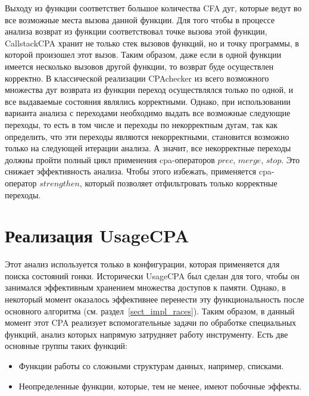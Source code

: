 Выходу из функции соответствет большое количества CFA дуг, которые ведут во все возможные места вызова данной функции.
Для того чтобы в процессе анализа возврат из функции соответствовал точке вызова этой функции, CallstackCPA хранит не только стек вызовов функций, но и точку программы, в которой произошел этот вызов.
Таким образом, даже если в одной функции имеется несколько вызовов другой функции, то возврат буде осуществлен корректно.
В классической реализации CPAchecker из всего возможного множества дуг возврата из функции переход осуществлялся только по одной, и все выдаваемые состояния являлись корректными.
Однако, при использовании варианта анализа с переходами необходимо выдать все возможные следующие переходы, то есть в том числе и переходы по некорректным дугам, так как определить, что эти переходы являются некорректными, становится возможно только на следующей итерации анализа.
А значит, все некорректные переходы должны пройти полный цикл применения cpa-операторов $prec$, $merge$, $stop$.
Это снижает эффективность анализа.
Чтобы этого избежать, применяется cpa-оператор $strengthen$, который позволяет отфильтровать только корректные переходы.

\section{Реализация UsageCPA}
\label{sect_impl_usage}
Этот анализ используется только в конфигурации, которая применяется для поиска состояний гонки.
Исторически UsageCPA был сделан для того, чтобы он занимался эффективным хранением множества доступов к памяти.
Однако, в некоторый момент оказалось эффективнее перенести эту функциональность после основного алгоритма (см. раздел~\ref{sect_impl_races}).
Таким образом, в данный момент этот CPA реализует вспомогательные задачи по обработке специальных функций, анализ которых напрямую затрудняет работу инструменту.
Есть две основные группы таких функций:
\begin{itemize}
\item Функции работы со сложными структурам данных, например, списками.
\item Неопределенные функции, которые, тем не менее, имеют побочные эффекты.
\end{itemize}

